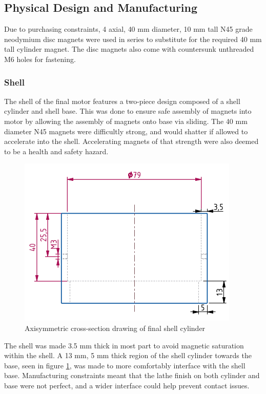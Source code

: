 \documentclass[a4paper,12pt]{article}
\begin{document}
\subsection{Physical Design and Manufacturing}

Due to purchasing constraints, 4 axial, 40 mm diameter, 10 mm tall N45 grade neodymium disc magnets were used in series to substitute for the required 40 mm tall cylinder magnet. The disc magnets also come with countersunk unthreaded M6 holes for fastening.

\subsubsection{Shell}

The shell of the final motor features a two-piece design composed of a shell cylinder and shell base. This was done to ensure safe assembly of magnets into motor by allowing the assembly of magnets onto base via sliding. The 40 mm diameter N45 magnets were difficultly strong, and would shatter if allowed to accelerate into the shell. Accelerating magnets of that strength were also deemed to be a health and safety hazard.

\begin{figure}[h!]
    \centering
    \includegraphics[scale=0.5]{shellcylinder.png}
    \caption{Axisymmetric cross-section drawing of final shell cylinder}
    \label{fg:shellcylinder}
\end{figure}

The shell was made 3.5 mm thick in most part to avoid magnetic saturation within the shell. A 13 mm, 5 mm thick region of the shell cylinder towards the base, seen in figure \ref{fg:shellcylinder}, was made to more comfortably interface with the shell base. Manufacturing constraints meant that the lathe finish on both cylinder and base were not perfect, and a wider interface could help prevent contact issues.
\end{document}
